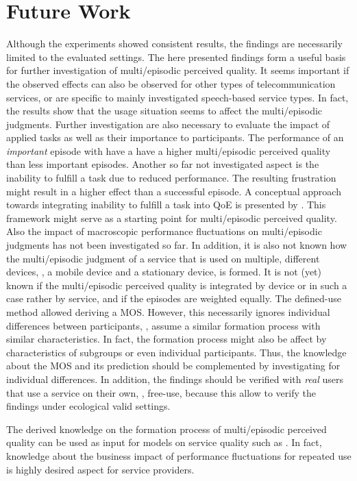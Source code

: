 \section{Future Work}
Although the experiments showed consistent results, the findings are necessarily limited to the evaluated settings.
The here presented findings form a useful basis for further investigation of multi\-/episodic perceived quality.
It seems important if the observed effects can also be observed for other types of telecommunication services, or are specific to mainly investigated speech-based service types.
In fact, the results show that the usage situation seems to affect the multi\-/episodic judgments.
Further investigation are also necessary to evaluate the impact of applied tasks as well as their importance to participants.
The performance of an \emph{important} episode with have a have a higher multi\-/episodic perceived quality than less important episodes.
Another so far not investigated aspect is the inability to fulfill a task due to reduced performance.
The resulting frustration might result in a higher effect than a successful episode.
A conceptual approach towards integrating inability to fulfill a task into \ac{QoE} is presented by \citet{leon-garcia_generalizing_2014}.
This framework might serve as a starting point for multi\-/episodic perceived quality.
Also the impact of macroscopic performance fluctuations on multi\-/episodic judgments has not been investigated so far.
In addition, it is also not known how the multi\-/episodic judgment of a service that is used on multiple, different devices, \eg, a mobile device and a stationary device, is formed.
It is not (yet) known if the multi\-/episodic perceived quality is integrated by device or in such a case rather by service, and if the episodes are weighted equally.
The defined-use method allowed deriving a \ac{MOS}.
However, this necessarily ignores individual differences between participants, \ie, assume a similar formation process with similar characteristics.
In fact, the formation process might also be affect by characteristics of subgroups or even individual participants.
Thus, the knowledge about the \ac{MOS} and its prediction should be complemented by investigating for individual differences.
In addition, the findings should be verified with \emph{real} users that use a service on their own, \ie, free-use, because this allow to verify the findings under ecological valid settings.

The derived knowledge on the formation process of multi\-/episodic perceived quality can be used as input for models on service quality such as \citet{parasuraman_conceptual_1985}.
In fact, knowledge about the business impact of performance fluctuations for repeated use is highly desired aspect for service providers.